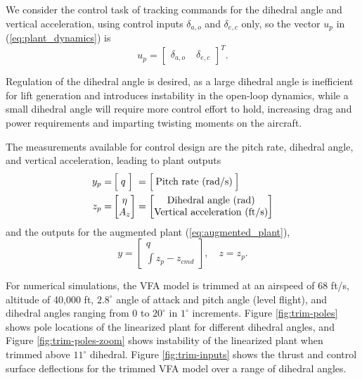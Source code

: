 We consider the control task of tracking commands for the dihedral angle and vertical acceleration, using control inputs $\delta_{a,o}$ and $\delta_{e,c}$ only, so the vector $u_p$ in (\ref{eq:plant_dynamics}) is
\begin{equation}
	u_p = \begin{bmatrix}
\delta_{a,o} & \; \delta_{e,c}
\end{bmatrix}^T.
\end{equation}

Regulation of the dihedral angle is desired, as a large dihedral angle is inefficient for lift generation and introduces instability in the open-loop dynamics, while a small dihedral angle will require more control effort to hold, increasing drag and power requirements and imparting twisting moments on the aircraft. 

The measurements available for control design are the pitch rate, dihedral angle, and vertical acceleration, leading to plant outputs
\begin{equation}
\begin{aligned}
y_p =& \, \Big[\; q \; \Big] \;= \Big[\: \text{Pitch rate (rad/s)} \:\Big] \\
z_p =& \begin{bmatrix}
\eta \\
A_z
\end{bmatrix} =\begin{bmatrix}
	$Dihedral angle (rad)$\\
	$Vertical acceleration (ft/s)$
\end{bmatrix}		
\end{aligned}
\end{equation}
and the outputs for the augmented plant (\ref{eq:augmented_plant}),
\begin{equation}
y = \begin{bmatrix}
	q \\ \int{z_p - z_{cmd}}
\end{bmatrix}, \quad z = z_p.
\end{equation}

For numerical simulations, the VFA model is trimmed at an airspeed of $68$ ft/s, altitude of 40,000 ft, $2.8^\circ$ angle of attack and pitch angle (level flight), and dihedral angles ranging from $0$ to $20^\circ$ in $1^\circ$ increments. Figure \ref{fig:trim-poles} shows pole locations of the linearized plant for different dihedral angles, and Figure \ref{fig:trim-poles-zoom} shows instability of the linearized plant when trimmed above $11^\circ$ dihedral. Figure \ref{fig:trim-inputs} shows the thrust and control surface deflections for the trimmed VFA model over a range of dihedral angles.

